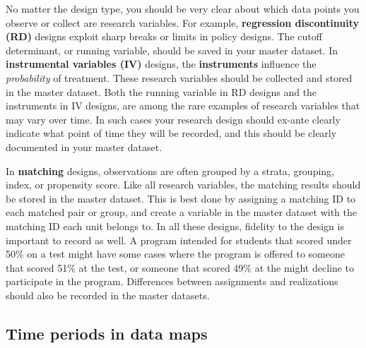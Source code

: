 No matter the design type, you should be very clear about
which data points you observe or collect are research variables.
For example,
\textbf{regression discontinuity (RD)}
designs exploit sharp breaks or limits
in policy designs.
The cutoff determinant, or running variable,
should be saved in your master dataset.
In \textbf{instrumental variables (IV)}
designs, the \textbf{instruments} influence the \textit{probability} of treatment.
These research variables should be collected
and stored in the master dataset.
Both the running variable in RD designs
and the instruments in IV designs,
are among the rare examples of research variables
that may vary over time.
In such cases your research design should
ex-ante clearly indicate what point of time they will be recorded,
and this should be clearly documented in your master dataset.

In \textbf{matching} designs, observations are often grouped
by a strata, grouping, index, or propensity score.
Like all research variables, the matching results
should be stored in the master dataset.
This is best done by assigning a matching ID
to each matched pair or group,
and create a variable in the master dataset
with the matching ID each unit belongs to.
In all these designs, fidelity to the design is important to record as well.
A program intended for students that scored under 50\% on a test
might have some cases where the program is offered to someone that scored 51\% at the test,
or someone that scored 49\% at the might decline to participate in the program.
Differences between assignments and realizations
should also be recorded in the master datasets.

\subsection{Time periods in data maps}

